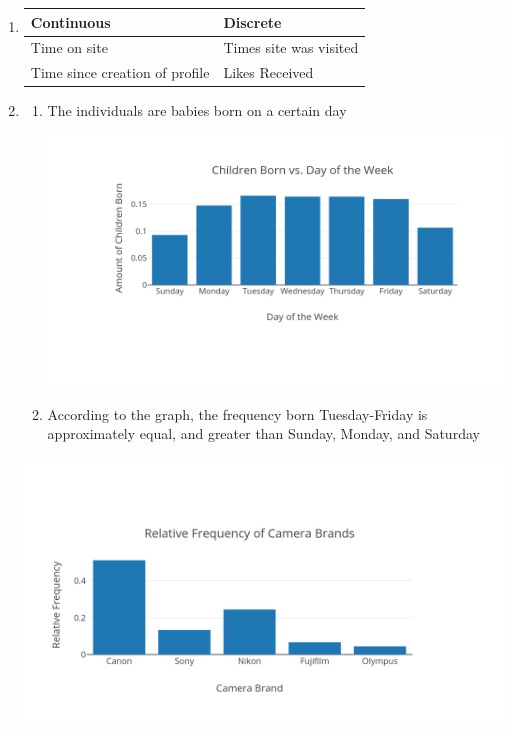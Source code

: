 \documentclass[12pt]{article}
\begin{document}
\begin{enumerate}
  \item \begin{tabular}{| l | l |} \hline Continuous & Discrete\\ \hline Time on site & Times site was visited  \\ \hline Time since creation of profile & Likes Received  \\\hline \end{tabular}

    \setcounter{enumi}{10}

    \newpage

  \item

    \begin{enumerate}

      \item The individuals are babies born on a certain day

        \begin{center}

          \includegraphics{Figures/1-1-1.png}
          
        \end{center}

      \item According to the graph, the frequency born Tuesday-Friday is approximately equal, and greater than Sunday, Monday, and Saturday

    \end{enumerate}

    \setcounter{enumi}{12}

    \begin{center}

      \includegraphics{Figures/1-1-2.png}
      

\end{center}
\end{enumerate}
\end{document}
